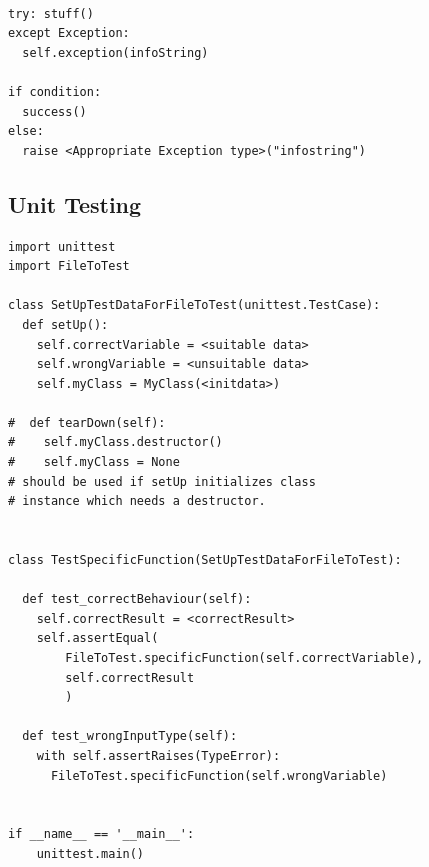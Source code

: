 \documentclass[10pt,a4paper]{article}
\begin{document}
\begin{lstlisting}

try: stuff()
except Exception:
  self.exception(infoString)
  
if condition:
  success()
else:
  raise <Appropriate Exception type>("infostring")

\end{lstlisting}


\newpage
\subsection{Unit Testing}

\begin{lstlisting}
import unittest
import FileToTest 

class SetUpTestDataForFileToTest(unittest.TestCase):
  def setUp():
    self.correctVariable = <suitable data>
    self.wrongVariable = <unsuitable data>
    self.myClass = MyClass(<initdata>) 
    
#  def tearDown(self):  
#    self.myClass.destructor()  
#    self.myClass = None
# should be used if setUp initializes class  
# instance which needs a destructor.


class TestSpecificFunction(SetUpTestDataForFileToTest):

  def test_correctBehaviour(self):
    self.correctResult = <correctResult>
    self.assertEqual(
        FileToTest.specificFunction(self.correctVariable), 
        self.correctResult
        )

  def test_wrongInputType(self):
    with self.assertRaises(TypeError):
      FileToTest.specificFunction(self.wrongVariable)


if __name__ == '__main__':
    unittest.main()

\end{lstlisting}
\end{document}
